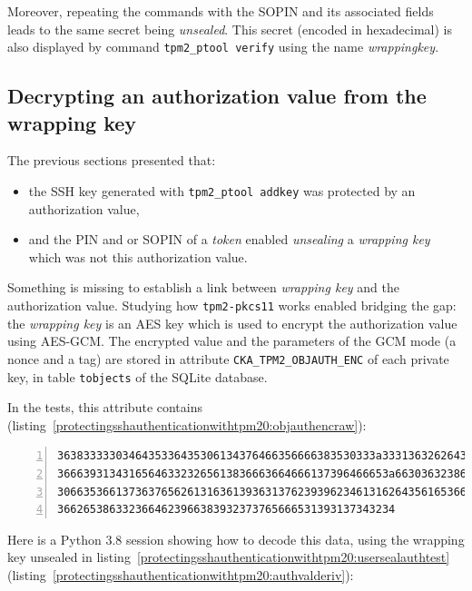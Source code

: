 Moreover, repeating the commands with the SOPIN and its associated
fields leads to the same secret being \emph{unsealed}. This secret
(encoded in hexadecimal) is also displayed by command
\texttt{tpm2\_ptool verify} using the name
\emph{wrappingkey}.

\subsection{Decrypting an authorization value from the wrapping key}

The previous sections presented that:

\begin{itemize}

\item
  the SSH key generated with
  \texttt{tpm2\_ptool addkey} was protected by an
  authorization value,
\item
  and the PIN and or SOPIN of a \emph{token} enabled \emph{unsealing} a
  \emph{wrapping key} which was not this authorization value.
\end{itemize}

Something is missing to establish a link between \emph{wrapping key} and
the authorization value. Studying how
\texttt{tpm2-pkcs11} works enabled bridging the gap:
the \emph{wrapping key} is an AES key which is used to encrypt the
authorization value using AES-GCM. The encrypted value and the
parameters of the GCM mode (a nonce and a tag) are stored in attribute
\texttt{CKA\_TPM2\_OBJAUTH\_ENC} of each private key,
in table \texttt{tobjects} of the SQLite database.

In the tests, this attribute contains
(listing~\ref{protectingsshauthenticationwithtpm20:objauthencraw}):

\begin{lstlisting}[numbers=left, caption={Attribute \texttt{CKA\_TPM2\_OBJAUTH\_ENC} of the generated SSH key}, label=protectingsshauthenticationwithtpm20:objauthencraw]
3638333330346435336435306134376466356666383530333a33313632626439
366639313431656463323265613836663664666137396466653a663036323866
3066353661373637656261316361393631376239396234613162643561653666
3662653863323664623966383932373765666531393137343234
\end{lstlisting}

Here is a Python 3.8 session showing how to decode this data, using the
wrapping key unsealed in
listing~\ref{protectingsshauthenticationwithtpm20:usersealauthtest}
(listing~\ref{protectingsshauthenticationwithtpm20:authvalderiv}):

